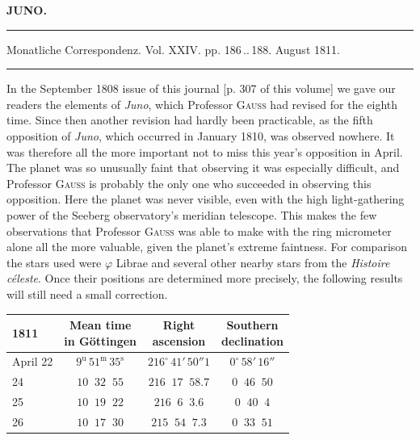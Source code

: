 \clearpage{}\hypertarget{native-335-lower}{}\label{native-335-lower}
\begin{center}\textbf{JUNO.}\par\vspace{4pt}\hrule\vspace{4pt}\fontsize{10}{12}\selectfont Monatliche Correspondenz. Vol. XXIV. pp. 186\,..\,188. August 1811.\par\vspace{4pt}\hrule\vspace{4pt}\end{center}

\par\indent In the September 1808 issue of this journal [p. 307 of this volume] we gave our readers the elements of \emph{Juno}, which Professor \textsc{Gauss} had revised for the eighth time. Since then another revision had hardly been practicable, as the fifth opposition of \emph{Juno}, which occurred in January 1810, was observed nowhere. It was therefore all the more important not to miss this year’s opposition in April. The planet was so unusually faint that observing it was especially difficult, and Professor \textsc{Gauss} is probably the only one who succeeded in observing this opposition. Here the planet was never visible, even with the high light-gathering power of the Seeberg observatory’s meridian telescope. This makes the few observations that Professor \textsc{Gauss} was able to make with the ring micrometer alone all the more valuable, given the planet’s extreme faintness. For comparison the stars used were $\varphi$ Librae and several other nearby stars from the \emph{Histoire céleste}. Once their positions are determined more precisely, the following results will still need a small correction.
\begin{center}\fontsize{10}{12}\selectfont\setlength{\tabcolsep}{4pt}\renewcommand{\arraystretch}{1.15}
\begin{tabular}{l|c|c|c}
1811 & \shortstack{Mean time\\in Göttingen} & \shortstack{Right\\ascension} & \shortstack{Southern\\declination} \\
\hline
April 22 & $9^{\mathrm u}\,51^{\mathrm m}\,35^{\mathrm s}$ & $216^\circ\,41'\,50''1$ & $0^\circ\,58'\,16''$ \\
\phantom{April }24 & $10\;\;32\;\;55$ & $216\;\;17\;\;58.7$ & $0\;\;46\;\;50$ \\
\phantom{April }25 & $10\;\;19\;\;22$ & $216\;\;6\;\;3.6$ & $0\;\;40\;\;4$ \\
\phantom{April }26 & $10\;\;17\;\;30$ & $215\;\;54\;\;7.3$ & $0\;\;33\;\;51$ \\
\end{tabular}
\end{center}

